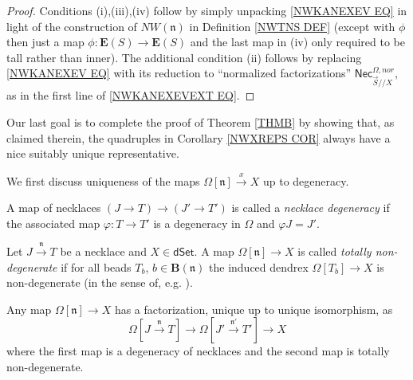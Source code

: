 \documentclass{hha}
\theoremstyle{definition} %
\begin{document}
\begin{proof}
	Conditions (i),(iii),(iv) follow by simply unpacking \eqref{NWKANEXEV EQ} in light of the construction of 
	$NW(\mathfrak{n})$ in Definition \ref{NWTNS DEF}
	(except with $\phi$ then just a map
	$\phi\colon \boldsymbol{E}(S) \to \boldsymbol{E}(S)$
	and the last map in (iv) only required to be tall rather than inner).
	The additional condition (ii) follows by replacing 
	\eqref{NWKANEXEV EQ} with its reduction to 
	``normalized
	factorizations''
	$\mathsf{Nec}_{\vec{S}//X}^{\Omega,nor}$,
	as in the first line of \eqref{NWKANEXEVEXT EQ}.
\end{proof}



Our last goal is to complete the proof of Theorem \ref{THMB}
by showing that, as claimed therein, 
the quadruples in Corollary \ref{NWXREPS COR}
always have a nice suitably unique representative.


We first discuss uniqueness of the maps
$\Omega[\mathfrak{n}] \xrightarrow{x} X$ up to degeneracy.

\begin{definition}\label{NECKDEG DEF}
	A map of necklaces 
	$(J\to T) \to (J' \to T')$
	is called a \emph{necklace degeneracy}
	if the associated map
	$\varphi \colon T \to T'$
	is a degeneracy in $\Omega$
	and $\varphi J = J'$.
\end{definition}



\begin{definition}[{cf. \cite[\S 4]{DS11}}]
        \label{TOTNONDEG_DEF}
	Let $J \xrightarrow{\mathfrak{n}} T$ be a necklace and 
	$X \in \mathsf{dSet}$.
	A map $\Omega[\mathfrak{n}] \to X$
	is called \emph{totally non-degenerate}
	if for all beads $T_b$, 
	$b \in \boldsymbol{B}(\mathfrak{n})$
	the induced dendrex
	$\Omega[T_b] \to X$
	is non-degenerate (in the sense of, 
	e.g. \cite[Prop. 5.62]{Per18}).
\end{definition}



\begin{lemma}[{cf. \cite[Prop. 4.7]{DS11}}]
	\label{DEGNECK LEM}
	Any map 
	$\Omega[\mathfrak{n}] \to X$
	has a factorization, unique up to unique isomorphism, as
\[
	\Omega[J \xrightarrow{\mathfrak{n}} T] \to 
	\Omega[J' \xrightarrow{\mathfrak{n'}} T'] \to X
\]
	where the first map is a degeneracy of necklaces
	and the second map is totally non-degenerate.
\end{lemma}
\end{document}
